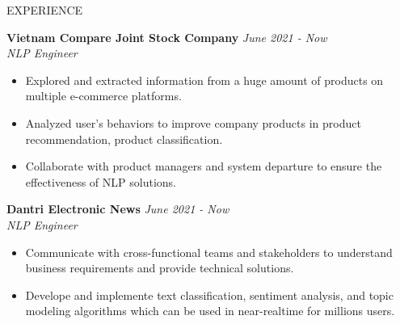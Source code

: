 \documentclass{resume} %
\begin{document}
\begin{rSection}{EXPERIENCE}

 \textbf{Vietnam Compare Joint Stock Company} \hfill \textit{June 2021 - Now}\\
\textit{NLP Engineer}

 \begin{itemize}
     \item Explored and extracted information from a huge amount of products on multiple e-commerce platforms.
     \item Analyzed user's behaviors to improve company products in product recommendation, product classification.
     \item Collaborate with product managers and system departure to ensure the effectiveness of NLP solutions.
 \end{itemize}

\textbf{Dantri Electronic News} \hfill \textit{June 2021 - Now}\\
\textit{NLP Engineer}

 \begin{itemize}
     \item Communicate with cross-functional teams and stakeholders to understand business requirements and provide technical solutions.
     \item Develope and implemente text classification, sentiment analysis, and topic modeling algorithms which can be used in near-realtime for millions users.
 \end{itemize}
 

\end{rSection} 

\end{document}
